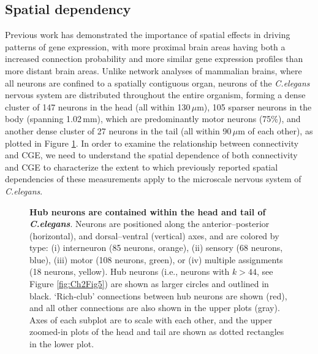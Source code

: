 \subsection{Spatial dependency}
Previous work has demonstrated the importance of spatial effects in driving patterns of gene expression, with more proximal brain areas
\citep{Horvat2016,Wang2016,Markov2013,Henderson2014,Fulcher2016,Noori2017,Levy2012,Azulay2016} having both a increased connection probability and more similar gene expression profiles \citep{Krienen2016, Fulcher2016, Pantazatos2017, Richiardi2017} than more distant brain areas.
Unlike network analyses of mammalian brains, where all neurons are confined to a spatially contiguous organ, neurons of the \emph{C.elegans} nervous system are distributed throughout the entire organism, forming a dense cluster of 147 neurons in the head (all within 130\,$\mu$m), 105 sparser neurons in the body (spanning 1.02\,mm), which are predominantly motor neurons (75\%), and another dense cluster of 27 neurons in the tail (all within 90\,$\mu$m of each other), as plotted in Figure \ref{fig:Ch2Fig2}.
In order to examine the relationship between connectivity and CGE, we need to understand the spatial dependence of both connectivity and CGE to characterize the extent to which previously reported spatial dependencies of these measurements apply to the microscale nervous system of \emph{C.elegans}.

\begin{figure}[h]
\caption{\textbf{Hub neurons are contained within the head and tail of \emph{C.elegans}}.
Neurons are positioned along the anterior--posterior (horizontal), and dorsal--ventral (vertical) axes, and are colored by type:
(i) interneuron (85 neurons, orange),
(ii) sensory (68 neurons, blue),
(iii) motor (108 neurons, green), or
(iv) multiple assignments (18 neurons, yellow).
Hub neurons (i.e., neurons with $k > 44$, see Figure \ref{fig:Ch2Fig5}) are shown as larger circles and outlined in black.
`Rich-club' connections between hub neurons are shown (red), and all other connections are also shown in the upper plots (gray).
Axes of each subplot are to scale with each other, and the upper zoomed-in plots of the head and tail are shown as dotted rectangles in the lower plot.}
\label{fig:Ch2Fig2}
\end{figure}

